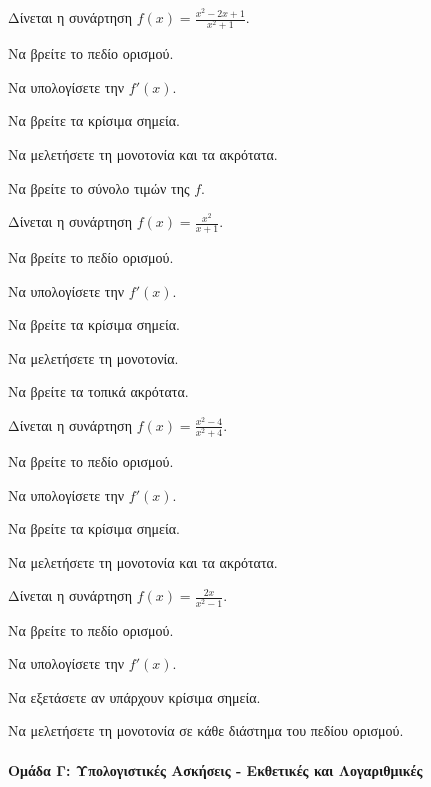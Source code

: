 \documentclass[11pt,a4paper,modern]{FFExercises}
\begin{document}
\askhsh
Δίνεται η συνάρτηση $f(x) = \frac{x^2 - 2x + 1}{x^2 + 1}$.
\begin{alist}
    \item Να βρείτε το πεδίο ορισμού.
    \item Να υπολογίσετε την $f'(x)$.
    \item Να βρείτε τα κρίσιμα σημεία.
    \item Να μελετήσετε τη μονοτονία και τα ακρότατα.
    \item Να βρείτε το σύνολο τιμών της $f$.
\end{alist}

\askhsh
Δίνεται η συνάρτηση $f(x) = \frac{x^2}{x+1}$.
\begin{alist}
    \item Να βρείτε το πεδίο ορισμού.
    \item Να υπολογίσετε την $f'(x)$.
    \item Να βρείτε τα κρίσιμα σημεία.
    \item Να μελετήσετε τη μονοτονία.
    \item Να βρείτε τα τοπικά ακρότατα.
\end{alist}

\askhsh
Δίνεται η συνάρτηση $f(x) = \frac{x^2 - 4}{x^2 + 4}$.
\begin{alist}
    \item Να βρείτε το πεδίο ορισμού.
    \item Να υπολογίσετε την $f'(x)$.
    \item Να βρείτε τα κρίσιμα σημεία.
    \item Να μελετήσετε τη μονοτονία και τα ακρότατα.
\end{alist}

\askhsh
Δίνεται η συνάρτηση $f(x) = \frac{2x}{x^2 - 1}$.
\begin{alist}
    \item Να βρείτε το πεδίο ορισμού.
    \item Να υπολογίσετε την $f'(x)$.
    \item Να εξετάσετε αν υπάρχουν κρίσιμα σημεία.
    \item Να μελετήσετε τη μονοτονία σε κάθε διάστημα του πεδίου ορισμού.
\end{alist}

\paragraph{Ομάδα Γ: Υπολογιστικές Ασκήσεις - Εκθετικές και Λογαριθμικές}
\end{document}
